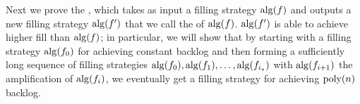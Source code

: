 

Next we prove the , which takes as
input a filling strategy $\alg(f)$ and outputs a new filling
strategy $\alg(f')$ that we call the  of
$\alg(f)$. $\alg(f')$ is able to achieve higher fill than
$\alg(f)$; in particular, we will show that by starting with a
filling strategy $\alg(f_0)$ for achieving constant backlog and
then forming a sufficiently long sequence of filling strategies
$\alg(f_0), \alg(f_1), \ldots, \alg(f_{i_*})$ with
$\alg(f_{i+1})$ the amplification of $\alg(f_i)$, we eventually
get a filling strategy for achieving $\poly(n)$ backlog.

